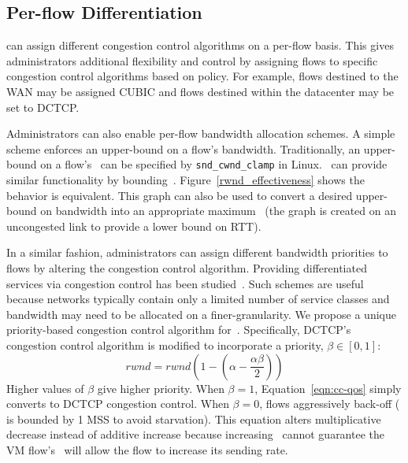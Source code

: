 \subsection{Per-flow Differentiation}
\label{ss:cc-qos}
\acdc{} can assign different congestion control algorithms
on a per-flow basis. This gives administrators additional flexibility and control by 
assigning flows to specific congestion control algorithms based on policy.
For example, flows destined to the WAN may be assigned CUBIC and flows destined within the
datacenter may be set to DCTCP. 

Administrators can also enable per-flow bandwidth allocation schemes.
A simple scheme enforces an upper-bound
on a flow's bandwidth. Traditionally, an upper-bound on a flow's~\cwnd{} can be
specified by {\tt snd\_cwnd\_clamp} in Linux.~\acdc{} can provide similar functionality
by bounding~\rwnd{}. Figure~\ref{rwnd_effectiveness} shows the behavior is equivalent. This 
graph can also be used to convert a desired upper-bound on bandwidth into an appropriate maximum~\rwnd{} (the
graph is created on an uncongested link to provide a lower bound on RTT). 

In a similar fashion, administrators can assign different bandwidth priorities to flows by altering the 
congestion control algorithm. Providing differentiated services via congestion control has 
been studied~\cite{Venkataramani2002tcpnice,shieh2011sharing}. Such schemes are useful because networks
typically contain only a limited number of service classes and bandwidth may need to be allocated on
a finer-granularity. We propose a unique priority-based congestion control algorithm for~\acdc{}.
Specifically, DCTCP's congestion control algorithm is modified to incorporate a priority, $\beta \in [0,1]$:
\begin{equation}
rwnd = rwnd (1 - (\alpha - \frac{\alpha{}\beta}{2}))
\label{eqn:cc-qos}
\end{equation}
Higher values of $\beta$ give higher priority. 
When $\beta{}=1$, Equation~\ref{eqn:cc-qos} simply converts to DCTCP congestion control. When
$\beta{}=0$, flows aggressively back-off (\rwnd{} is bounded by 1 MSS to avoid starvation). This equation
alters multiplicative decrease instead of additive increase because increasing~\rwnd{} 
cannot guarantee the VM flow's~\cwnd{} will allow the flow to increase its sending rate.

%
%
%


